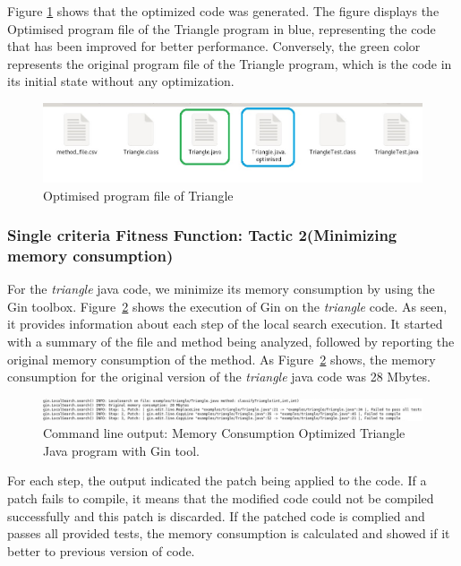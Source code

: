 \vspace{.5em}
Figure \ref{fig:Optimised program file of Triangle}
shows that the optimized code was generated. The figure displays the Optimised program file of the Triangle program in blue, representing the code that has been improved for better performance. Conversely, the green color represents the original program file of the Triangle program, which is the code in its initial state without any optimization.

\begin{figure}[ht!]
  \centering
  \includegraphics[width=.49\textwidth]{img/Triangle_Experiment_output.jpg}
  \caption{Optimised program file of Triangle}
  \label{fig:Optimised program file of Triangle}
\end{figure}



\subsubsection{Single criteria Fitness Function: Tactic 2(Minimizing memory consumption)}

For the \textit{triangle} java code, we minimize its memory consumption by using the Gin toolbox. Figure~\ref{fig:MC_2} shows the execution of Gin on the \textit{triangle} code. As seen, it provides information about each step of the local search execution. It started with a summary of the file and method being analyzed, followed by reporting the original memory consumption of the method. As Figure~\ref{fig:MC_2} shows, the memory consumption for the original version of the \textit{triangle} java code was 28 Mbytes.

\begin{figure}[htbp]
  \centering
  \includegraphics[width=1\textwidth]{img/Triangle_MC_2.png}
  \caption{Command line output: Memory Consumption Optimized Triangle Java program with Gin tool.}
  \label{fig:MC_2}
\end{figure}

\vspace{5em}
For each step, the output indicated the patch being applied to the code. If a patch fails to compile, it means that the modified code could not be compiled successfully and this patch is discarded. If the patched code is complied and passes all provided tests, the memory consumption is calculated and showed if it better to previous version of code.

